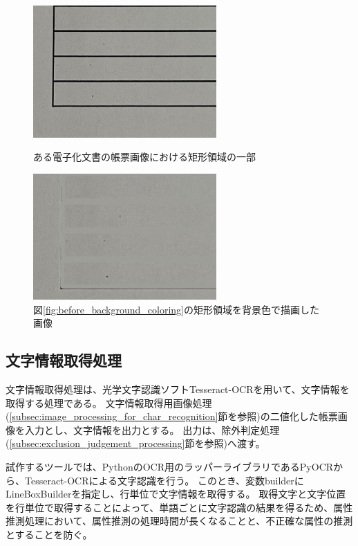 \begin{figure}[ht]
    \centering
    \begin{minipage}[c]{0.45\linewidth}
        \centering
        \includegraphics[keepaspectratio, width=7cm]{image/04-implementation/before_background_coloring.jpg}
        \caption{ある電子化文書の帳票画像における矩形領域の一部}
        \label{fig:before_background_coloring}
    \end{minipage}
    \begin{minipage}[c]{0.45\linewidth}
        \centering
        \includegraphics[keepaspectratio, width=7cm]{image/04-implementation/after_background_coloring.png}
        \caption{図\ref{fig:before_background_coloring}の矩形領域を背景色で描画した画像}
        \label{fig:after_background_coloring}
    \end{minipage}
\end{figure}

\subsection{文字情報取得処理}\label{subsec:char_information_obtainment_processing}
文字情報取得処理は、光学文字認識ソフトTesseract-OCRを用いて、文字情報を取得する処理である。
文字情報取得用画像処理(\ref{subsec:image_processing_for_char_recognition}節を参照)の二値化した帳票画像を入力とし、文字情報を出力とする。
出力は、除外判定処理(\ref{subsec:exclusion_judgement_processing}節を参照)へ渡す。

試作するツールでは、PythonのOCR用のラッパーライブラリであるPyOCR\cite{PyOCR}から、Tesseract-OCRによる文字認識を行う。
このとき、変数builderにLineBoxBuilderを指定し、行単位で文字情報を取得する。
取得文字と文字位置を行単位で取得することによって、単語ごとに文字認識の結果を得るため、属性推測処理において、属性推測の処理時間が長くなることと、不正確な属性の推測とすることを防ぐ。

